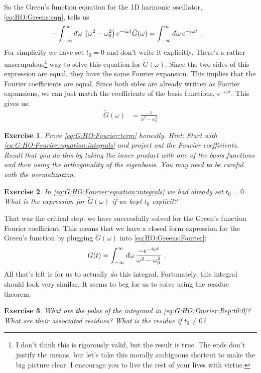 \documentclass[
  11pt,
	colorful,
	raggedright,
]{tufte-style-thesis-flip}
\newtheorem{exercise}{Exercise}[section]
\renewcommand{\dbar}{d\mkern-6mu\mathchar'26\hspace{-.1em}}    %
\begin{document}
So the Green's function equation for the 1D harmonic oscillator, \eqref{eq:HO:Greens:eqn}, tells us
\begin{align}
  -
  \int_{-\infty}^\infty \dbar \omega \, 
  \left(\omega^2-\omega_0^2\right) e^{-i\omega t} \tilde G(\omega)
  &=
  \int_{-\infty}^\infty \dbar \omega \, e^{-i\omega t}
  \ .
  \label{eq:G:HO:Fourier:equation:integrals}
\end{align}
For simplicity we have set $t_0=0$ and don't write it explicitly. There's a rather unscrupulous\footnote{I don't think this is rigorously valid, but the result is true. The ends don't justify the means, but let's take this morally ambiguous shortcut to make the big picture clear. I encourage you to live the rest of your lives with virtue.} way to solve this equation for $\tilde G(\omega)$. Since the two sides of this expression are equal, they have the same Fourier expansion. This implies that the Fourier coefficients are equal. Since both sides are already written as Fourier expansions, we can just match the coefficients of the basis functions, $e^{-i\omega t}$. This gives us:
\begin{align}
  \tilde G(\omega) &= \frac{-1}{\omega^2-\omega_0^2}
  \label{eq:G:HO:Fourier:term}
\end{align}
\begin{exercise}
Prove \eqref{eq:G:HO:Fourier:term} honestly. {Hint}: Start with \eqref{eq:G:HO:Fourier:equation:integrals} and project out the Fourier coefficients. Recall that you do this by taking the inner product with one of the basis functions and then using the orthogonality of the eigenbasis. You may need to be careful with the normalization.
\end{exercise}
\begin{exercise}
In \eqref{eq:G:HO:Fourier:equation:integrals} we had already set $t_0 = 0$. What is the expression for $\tilde G(\omega)$ if we kept $t_0$ explicit?
\label{eq:ex:Gtilde:with:t0:explicit}
\end{exercise}
That was the critical step: we have successfully solved for the Green's function Fourier coefficient. This means that we have a closed form expression for the Green's function by plugging $\tilde G(\omega)$ into \eqref{eq:HO:Greens:Fourier}:
\begin{align}
  G(t) &=  \int_{-\infty}^\infty \dbar \omega
  \, 
  \frac{-e^{-i\omega t}}{\omega^2-\omega_0^2} \ .
  \label{eq:G:HO:Fourier:Rep:t0:0}
\end{align}
All that's left is for us to actually \emph{do} this integral. Fortunately, this integral should look very similar. It seems to beg for us to solve using the residue theorem. 
\begin{exercise}
What are the poles of the integrand in \eqref{eq:G:HO:Fourier:Rep:t0:0}? What are their associated residues? What is the residue if $t_0\neq 0$?
\end{exercise}
\end{document}

